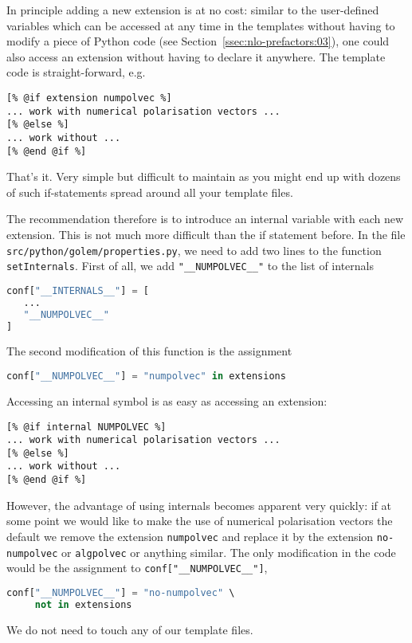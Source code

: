 \documentclass[11pt,a4paper]{refrep}
\begin{document}
In principle adding a new extension is at no cost: similar to the
user-defined variables which can be accessed at any time in the templates
without having to modify a piece of Python code
(see Section~\ref{ssec:nlo-prefactors:03}), one could also access
an extension without having to declare it anywhere. The template
code is straight-forward, e.g.
\begin{lstlisting}
[% @if extension numpolvec %]
... work with numerical polarisation vectors ...
[% @else %]
... work without ...
[% @end @if %]
\end{lstlisting}
That's it. Very simple but difficult to maintain as you might end up
with dozens of such if-statements spread around all your template files.

The recommendation therefore is to introduce an internal variable
with each new extension. This is not much more difficult than the
if statement before. In the file
\texttt{src/\hspace{0pt}python/\hspace{0pt}golem/\hspace{0pt}properties.py},
we need to add two lines to the function \texttt{setInternals}.
First of all, we add \texttt{"\_\_NUMPOLVEC\_\_"} to the list of internals
\begin{lstlisting}[language=Python]
conf["__INTERNALS__"] = [
   ...
   "__NUMPOLVEC__"
]
\end{lstlisting}
The second modification of this function is the assignment
\begin{lstlisting}[language=Python]
conf["__NUMPOLVEC__"] = "numpolvec" in extensions
\end{lstlisting}

Accessing an internal symbol is as easy as accessing an extension:
\begin{lstlisting}
[% @if internal NUMPOLVEC %]
... work with numerical polarisation vectors ...
[% @else %]
... work without ...
[% @end @if %]
\end{lstlisting}
However, the advantage of using internals becomes apparent very
quickly: if at some point we would like to make the use of numerical
polarisation vectors the default we remove the extension \texttt{numpolvec}
and replace it by the extension \texttt{no-numpolvec} or \texttt{algpolvec}
or anything similar. The only modification in the code would be the
assignment to \texttt{conf["\_\_NUMPOLVEC\_\_"]},
\begin{lstlisting}[language=Python]
conf["__NUMPOLVEC__"] = "no-numpolvec" \
     not in extensions
\end{lstlisting}
We do not need to touch any of our template files.
\end{document}

